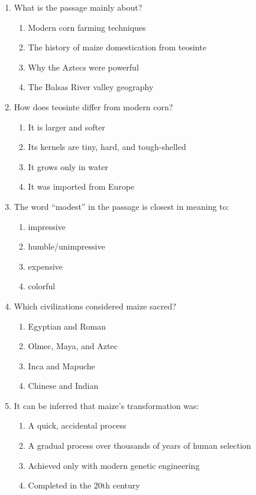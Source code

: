 \documentclass[10pt,a4paper]{article}
\begin{document}
\begin{enumerate}[leftmargin=*, label=\textbf{\arabic*.}, start=11]

\item What is the passage mainly about?
\begin{enumerate}[label=(\Alph*)]
  \item Modern corn farming techniques
  \item The history of maize domestication from teosinte
  \item Why the Aztecs were powerful
  \item The Balsas River valley geography
\end{enumerate}

\item How does teosinte differ from modern corn?
\begin{enumerate}[label=(\Alph*)]
  \item It is larger and softer
  \item Its kernels are tiny, hard, and tough-shelled
  \item It grows only in water
  \item It was imported from Europe
\end{enumerate}

\item The word ``modest'' in the passage is closest in meaning to:
\begin{enumerate}[label=(\Alph*)]
  \item impressive
  \item humble/unimpressive
  \item expensive
  \item colorful
\end{enumerate}

\item Which civilizations considered maize sacred?
\begin{enumerate}[label=(\Alph*)]
  \item Egyptian and Roman
  \item Olmec, Maya, and Aztec
  \item Inca and Mapuche
  \item Chinese and Indian
\end{enumerate}

\item It can be inferred that maize's transformation was:
\begin{enumerate}[label=(\Alph*)]
  \item A quick, accidental process
  \item A gradual process over thousands of years of human selection
  \item Achieved only with modern genetic engineering
  \item Completed in the 20th century
\end{enumerate}

\end{enumerate}
\end{document}
